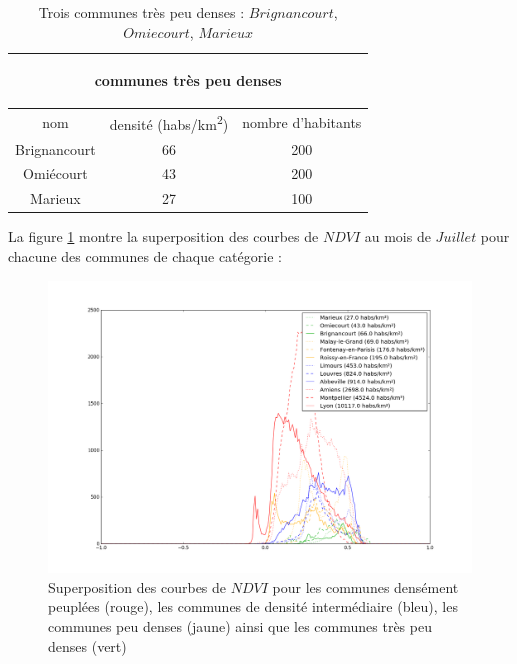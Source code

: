 \documentclass{book}
\begin{document}
\begin{table}
\begin{center}
\begin{adjustbox}{max width=\textwidth}
\begin{tabular}{|c|c|c|}
\hline
\multicolumn{3}{c|}{\begin{bf}communes très peu denses\end{bf}} \\
\hline 
nom & densité (habs/km\textsuperscript{2}) & nombre d'habitants \\
\hline 
Brignancourt & 66 & 200\\
\hline 
Omiécourt & 43 & 200 \\
\hline 
Marieux & 27 & 100 \\
\hline
\end{tabular}
\end{adjustbox}
\end{center}
\caption{Trois communes très peu denses : $Brignancourt$, $Omiecourt$, $Marieux$}
\label{cat4}
\end{table}

\clearpage

La figure \ref{ndvi_categorie} montre la superposition des courbes de $NDVI$ au mois de $Juillet$ pour chacune des communes de chaque catégorie :\\
\begin{figure}[H]
\centerline{
\includegraphics[scale=0.5]{images/ndvi_categorie.png}
}
\caption{Superposition des courbes de $NDVI$ pour les communes densément peuplées (rouge), les communes de densité intermédiaire (bleu),
les communes peu denses (jaune) ainsi que les communes très peu denses (vert)}
\label{ndvi_categorie}
\end{figure}
\clearpage
\end{document}
